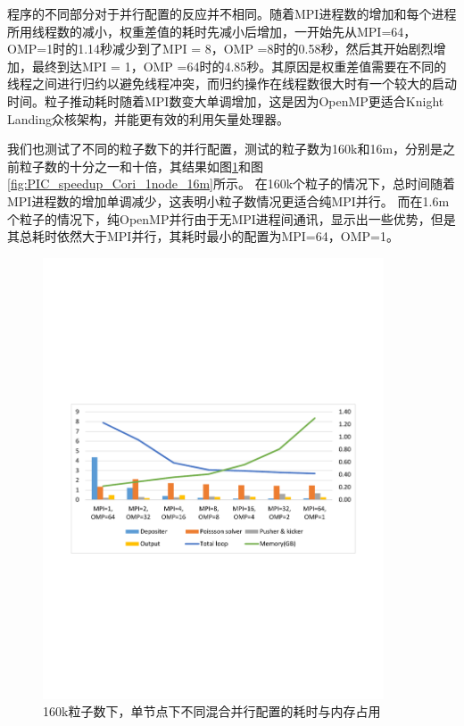 程序的不同部分对于并行配置的反应并不相同。随着MPI进程数的增加和每个进程所用线程数的减小，权重差值的耗时先减小后增加，一开始先从MPI=64，OMP=1时的1.14秒减少到了MPI = 8，OMP =8时的0.58秒，然后其开始剧烈增加，最终到达MPI = 1，OMP =64时的4.85秒。其原因是权重差值需要在不同的线程之间进行归约以避免线程冲突，而归约操作在线程数很大时有一个较大的启动时间。粒子推动耗时随着MPI数变大单调增加，这是因为OpenMP更适合Knight Landing众核架构，并能更有效的利用矢量处理器。

我们也测试了不同的粒子数下的并行配置，测试的粒子数为160k和16m，分别是之前粒子数的十分之一和十倍，其结果如图\ref{fig:PIC_speedup_Cori_1node_160k}和图\ref{fig:PIC_speedup_Cori_1node_16m}所示。
在160k个粒子的情况下，总时间随着MPI进程数的增加单调减少，这表明小粒子数情况更适合纯MPI并行。
而在1.6m个粒子的情况下，纯OpenMP并行由于无MPI进程间通讯，显示出一些优势，但是其总耗时依然大于MPI并行，其耗时最小的配置为MPI=64，OMP=1。

\begin{figure}[!htb]
  \centering
  \includegraphics[width=0.9\textwidth]{Img/PIC_speedup_Cori_1node_160k.pdf}
  \caption{160k粒子数下，单节点下不同混合并行配置的耗时与内存占用}
  \label{fig:PIC_speedup_Cori_1node_160k}
\end{figure}

